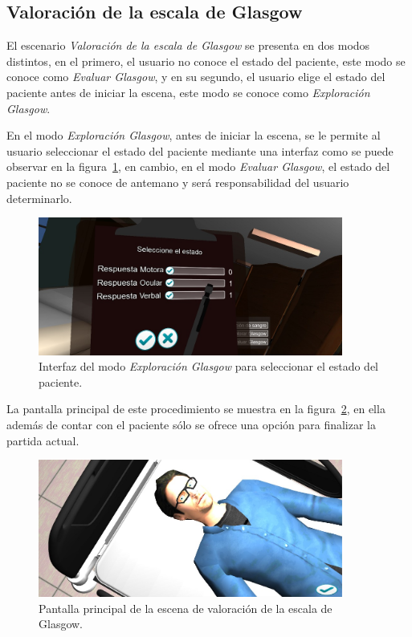\subsection{Valoración de la escala de Glasgow}

El escenario \emph{Valoración de la escala de Glasgow} se presenta en dos modos
distintos, en el primero, el usuario no conoce el estado del paciente, este modo
se conoce como \emph{Evaluar Glasgow}, y en su segundo, el usuario elige el
estado del paciente antes de iniciar la escena, este modo se conoce como
\emph{Exploración Glasgow}. 


En el modo \emph{Exploración Glasgow}, antes de iniciar la escena, se le
permite al usuario seleccionar el estado del paciente mediante una interfaz 
como se puede observar en la figura~\ref{fig:glasgow_seleccion}, en
cambio, en el modo \emph{Evaluar Glasgow}, el estado del paciente no se conoce
de antemano y será responsabilidad del usuario determinarlo.

\begin{figure}[H]
\centering
\includegraphics[width=10cm]{solucion/images/glasgow_seleccion.jpg}
\caption{Interfaz del modo \emph{Exploración Glasgow} para seleccionar el estado del 
paciente.}
\label{fig:glasgow_seleccion}
\end{figure}

La pantalla principal de este procedimiento se muestra en la
figura~\ref{fig:glasgow_principal}, en ella además de contar con el paciente sólo se ofrece
una opción para finalizar la partida actual.

\begin{figure}[H]
\centering
\includegraphics[width=10cm]{solucion/images/glasgow_principal.jpg}
\caption{Pantalla principal de la escena de valoración de la escala de Glasgow.}
\label{fig:glasgow_principal}
\end{figure}



